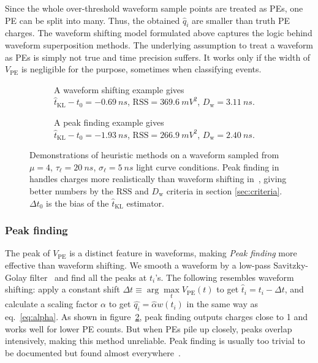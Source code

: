 Since the whole over-threshold waveform sample points are treated as PEs, one PE can be split into many. Thus, the obtained $\hat{q}_i$ are smaller than truth PE charges. The waveform shifting model formulated above captures the logic behind waveform superposition methods.  The underlying assumption to treat a waveform as PEs is simply not true and time precision suffers.  It works only if the width of $V_\mathrm{PE}$ is negligible for the purpose, sometimes when classifying events.

\begin{figure}[H]
  \begin{subfigure}{.5\textwidth}
    \centering
    \resizebox{\textwidth}{!}{}
    \caption{\label{fig:shifting} A waveform shifting example gives \\ $\hat{t}_\mathrm{KL}-t_0=\SI{-0.69}{ns}$, $\mathrm{RSS}=\SI{369.6}{mV^2}$, $D_\mathrm{w}=\SI{3.11}{ns}$.}
  \end{subfigure}
  \begin{subfigure}{.5\textwidth}
    \centering
    \resizebox{\textwidth}{!}{}
    \caption{\label{fig:peak} A peak finding example gives \\ $\hat{t}_\mathrm{KL} - t_0=\SI{-1.93}{ns}$, $\mathrm{RSS}=\SI{266.9}{mV^2}$, $D_\mathrm{w}=\SI{2.40}{ns}$.}
  \end{subfigure}
  \caption{\label{fig:method}Demonstrations of heuristic methods on a waveform sampled from $\mu=4$, $\tau_\ell=\SI{20}{ns}$, $\sigma_\ell=\SI{5}{ns}$ light curve conditions.  Peak finding in~ handles charges more realistically than waveform shifting in~, giving better numbers by the $\mathrm{RSS}$ and $D_\mathrm{w}$ criteria in section \ref{sec:criteria}. $\Delta t_0$ is the bias of the $\hat{t}_\mathrm{KL}$ estimator.}
\end{figure}

\subsubsection{Peak finding}
\label{sec:findpeak}

The peak of $V_\mathrm{PE}$ is a distinct feature in waveforms, making \textit{Peak finding} more effective than waveform shifting.  We smooth a waveform by a low-pass Savitzky-Golay filter~\cite{savitzky_smoothing_1964} and find all the peaks at $t_i$'s.  The following resembles waveform shifting: apply a constant shift $\Delta t \equiv \arg\underset{t}{\max} V_\mathrm{PE}(t)$ to get $\hat{t}_i = t_i - \Delta t$, and calculate a scaling factor $\alpha$ to get $\hat{q_i}=\hat{\alpha} w(t_i)$ in the same way as eq.~\eqref{eq:alpha}.  As shown in figure~\ref{fig:peak}, peak finding outputs charges close to 1 and works well for lower PE counts.  But when PEs pile up closely, peaks overlap intensively, making this method unreliable.  Peak finding is usually too trivial to be documented but found almost everywhere~\cite{students22}.

